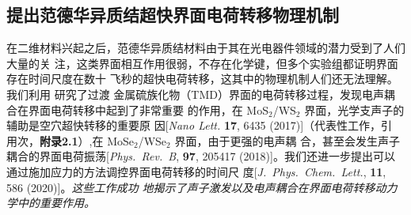 \subsection{提出范德华异质结超快界面电荷转移物理机制}




在二维材料兴起之后，范德华异质结材料由于其在光电器件领域的潜力受到了人们大量的关
注，这类界面相互作用很弱，不存在化学键，但多个实验组都证明界面存在时间尺度在数十
飞秒的超快电荷转移，这其中的物理机制人们还无法理解。我们利用 \hnamd{} 研究了过渡
金属硫族化物（TMD）界面的电荷转移过程，发现电声耦合在界面电荷转移中起到了非常重要
的作用，在 MoS$_2$/WS$_2$ 界面，光学支声子的辅助是空穴超快转移的重要原
因[\textit{Nano Lett.} \textbf{17}, 6435 (2017)]（代表性工作，引
用次，\textbf{附录2.1}）,在 MoSe$_2$/WSe$_2$ 界面，由于更强的电声耦
合，甚至会发生声子耦合的界面电荷振荡[\textit{Phys.\ Rev.\ B}, \textbf{97},
205417 (2018)]。我们还进一步提出可以通过施加应力的方法调控界面电荷转移的时间尺
度[\textit{J.\ Phys.\ Chem.\ Lett.}, \textbf{11}, 586 (2020)]。\emph{这些工作成功
  地揭示了声子激发以及电声耦合在界面电荷转移动力学中的重要作用。}

